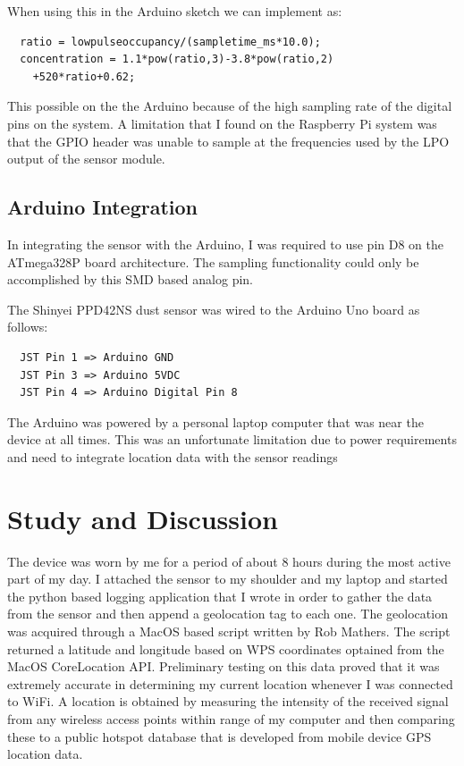 \documentclass{sigchi}
\begin{document}
When using this in the Arduino sketch we can implement as:

\begin{verbatim}
  ratio = lowpulseoccupancy/(sampletime_ms*10.0);
  concentration = 1.1*pow(ratio,3)-3.8*pow(ratio,2)
    +520*ratio+0.62;
\end{verbatim}

This possible on the the Arduino because of the high sampling rate of the
digital pins on the system. A limitation that I found on the Raspberry Pi system
was that the GPIO header was unable to sample at the frequencies used by the LPO
output of the sensor module.

\subsection{Arduino Integration}

In integrating the sensor with the Arduino, I was required to use pin D8
on the ATmega328P board architecture. The sampling functionality could only be accomplished
by this SMD based analog pin.

The Shinyei PPD42NS dust sensor was wired to the Arduino Uno board as follows:

\begin{verbatim}
  JST Pin 1 => Arduino GND
  JST Pin 3 => Arduino 5VDC
  JST Pin 4 => Arduino Digital Pin 8
\end{verbatim}

The Arduino was powered by a personal laptop computer that was near the device at
all times. This was an unfortunate limitation due to power requirements and need
to integrate location data with the sensor readings

\section{Study and Discussion}

The device was worn by me for a period of about 8 hours during the most active
part of my day. I attached the sensor to my shoulder and my laptop and started
the python based logging application that I wrote in order to gather the data
from the sensor and then append a geolocation tag to each one. The geolocation
was acquired through a MacOS based script written by Rob Mathers. \cite{whereami}
The script returned a latitude and longitude based on WPS coordinates optained from
the MacOS CoreLocation API. Preliminary testing on this data proved that it was
extremely accurate in determining my current location whenever I was connected to
WiFi. A location is obtained by measuring the intensity of the received signal from
any wireless access points within range of my computer and then comparing these
to a public hotspot database that is developed from mobile device GPS location data. \cite{zahradnik}
\end{document}
